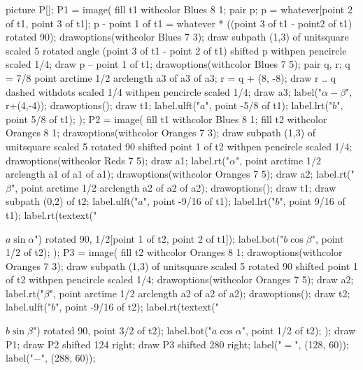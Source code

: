 \documentclass[oneside]{scrbook}
\begin{document}
picture P[];
P1 = image(
    fill t1 withcolor Blues 8 1;
    pair p; p = whatever[point 2 of t1, point 3 of t1];
    p - point 1 of t1 = whatever * ((point 3 of t1 - point2 of t1) rotated 90);
    drawoptions(withcolor Blues 7 3);
    draw subpath (1,3) of unitsquare scaled 5
        rotated angle (point 3 of t1 - point 2 of t1)
        shifted p withpen pencircle scaled 1/4;
    draw p -- point 1 of t1;
    drawoptions(withcolor Blues 7 5);
    pair q, r;
    q = 7/8 point arctime 1/2 arclength a3 of a3 of a3; r = q + (8, -8);
    draw r .. q dashed withdots scaled 1/4 withpen pencircle scaled 1/4;
    draw a3; label("$\alpha-\beta$", r+(4,-4));
    drawoptions();
    draw t1;
    label.ulft("$a$", point -5/8 of t1);
    label.lrt("$b$", point   5/8 of t1);
);
P2 = image(
    fill t1 withcolor Blues 8 1;
    fill t2 withcolor Oranges 8 1;
    drawoptions(withcolor Oranges 7 3);
    draw subpath (1,3) of unitsquare scaled 5
        rotated 90
        shifted point 1 of t2
        withpen pencircle scaled 1/4;
    drawoptions(withcolor Reds 7 5);
    draw a1; label.rt("$\alpha$", point arctime 1/2 arclength a1 of a1 of a1);
    drawoptions(withcolor Oranges 7 5);
    draw a2; label.rt("$\beta$", point arctime 1/2 arclength a2 of a2 of a2);
    drawoptions();
    draw t1; draw subpath (0,2) of t2;
    label.ulft("$a$", point -9/16 of t1);
    label.lrt("$b$", point   9/16 of t1);
    label.rt(textext("\strut$a\sin\alpha$") rotated 90, 1/2[point 1 of t2, point 2 of t1]);
    label.bot("$b\cos\beta$", point 1/2 of t2);
);
P3 = image(
    fill t2 withcolor Oranges 8 1;
    drawoptions(withcolor Oranges 7 3);
    draw subpath (1,3) of unitsquare scaled 5
        rotated 90
        shifted point 1 of t2
        withpen pencircle scaled 1/4;
    drawoptions(withcolor Oranges 7 5);
    draw a2; label.rt("$\beta$", point arctime 1/2 arclength a2 of a2 of a2);
    drawoptions();
    draw t2;
    label.ulft("$b$", point  -9/16 of t2);
    label.rt(textext("\strut$b\sin\beta$") rotated 90, point 3/2 of t2);
    label.bot("$a\cos\alpha$", point 1/2 of t2);
);
draw P1;
draw P2 shifted 124 right;
draw P3 shifted 280 right;
label("$=$", (128, 60));
label("$-$", (288, 60));
\end{document}
